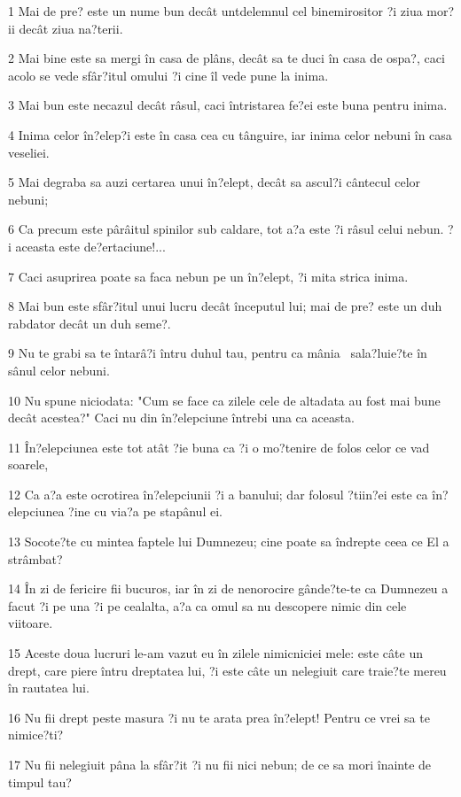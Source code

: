 \par 1 Mai de pre? este un nume bun decât untdelemnul cel binemirositor ?i ziua mor?ii decât ziua na?terii.
\par 2 Mai bine este sa mergi în casa de plâns, decât sa te duci în casa de ospa?, caci acolo se vede sfâr?itul omului ?i cine îl vede pune la inima.
\par 3 Mai bun este necazul decât râsul, caci întristarea fe?ei este buna pentru inima.
\par 4 Inima celor în?elep?i este în casa cea cu tânguire, iar inima celor nebuni în casa veseliei.
\par 5 Mai degraba sa auzi certarea unui în?elept, decât sa ascul?i cântecul celor nebuni;
\par 6 Ca precum este pârâitul spinilor sub caldare, tot a?a este ?i râsul celui nebun. ?i aceasta este de?ertaciune!...
\par 7 Caci asuprirea poate sa faca nebun pe un în?elept, ?i mita strica inima.
\par 8 Mai bun este sfâr?itul unui lucru decât începutul lui; mai de pre? este un duh rabdator decât un duh seme?.
\par 9 Nu te grabi sa te întarâ?i întru duhul tau, pentru ca mânia  sala?luie?te în sânul celor nebuni.
\par 10 Nu spune niciodata: "Cum se face ca zilele cele de altadata au fost mai bune decât acestea?" Caci nu din în?elepciune întrebi una ca aceasta.
\par 11 În?elepciunea este tot atât ?ie buna ca ?i o mo?tenire de folos celor ce vad soarele,
\par 12 Ca a?a este ocrotirea în?elepciunii ?i a banului; dar folosul ?tiin?ei este ca în?elepciunea ?ine cu via?a pe stapânul ei.
\par 13 Socote?te cu mintea faptele lui Dumnezeu; cine poate sa îndrepte ceea ce El a strâmbat?
\par 14 În zi de fericire fii bucuros, iar în zi de nenorocire gânde?te-te ca Dumnezeu a facut ?i pe una ?i pe cealalta, a?a ca omul sa nu descopere nimic din cele viitoare.
\par 15 Aceste doua lucruri le-am vazut eu în zilele nimicniciei mele: este câte un drept, care piere întru dreptatea lui, ?i este câte un nelegiuit care traie?te mereu în rautatea lui.
\par 16 Nu fii drept peste masura ?i nu te arata prea în?elept! Pentru ce vrei sa te nimice?ti?
\par 17 Nu fii nelegiuit pâna la sfâr?it ?i nu fii nici nebun; de ce sa mori înainte de timpul tau?
